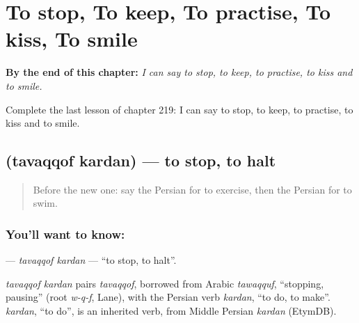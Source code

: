 
\chapter{To stop, To keep, To practise, To kiss, To smile}
\label{ch:fa-to-stop-to-keep-to-practise-to-kiss-to-smile}

\begin{chapteropening}
\textbf{By the end of this chapter:} \emph{I can say to stop, to keep, to practise, to kiss and to smile.}

Complete the last lesson of chapter 219: I can say to stop, to keep, to practise, to kiss and to smile.
\end{chapteropening}

\section[\texorpdfstring{\fa{توقف} \fa{کردن} (tavaqqof kardan)}{توقف کردن (tavaqqof kardan)}]{  (tavaqqof kardan) — to stop, to halt}

\label{lesson:FA-C219-tavaqqof-kardan}



\begin{quote}
Before the new one: say the Persian for to exercise, then the Persian for to swim.
\end{quote}

\subsection*{You'll want to know:  }
\textbf{ } — \emph{tavaqqof kardan} — \textquotedblleft{}to stop, to halt\textquotedblright{}.

\begin{cousinweb}
\emph{tavaqqof kardan} pairs \emph{tavaqqof}, borrowed from Arabic \emph{tawaqquf}, \textquotedblleft{}stopping, pausing\textquotedblright{} (root \emph{w-q-f}, Lane), with the Persian verb \emph{kardan}, \textquotedblleft{}to do, to make\textquotedblright{}. \emph{kardan}, \textquotedblleft{}to do\textquotedblright{}, is an inherited verb, from Middle Persian \emph{kardan} (EtymDB).
\end{cousinweb}

